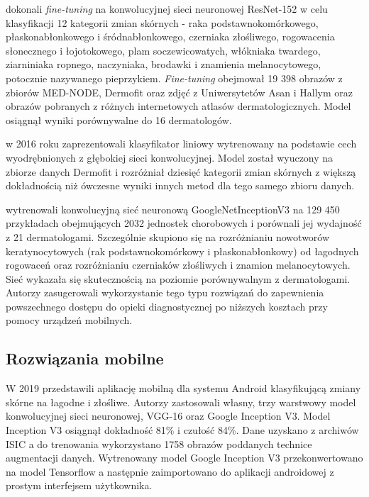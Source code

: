 \citet{Han_Kim_Lim_Park_Park_Chang_2018} dokonali \textit{fine-tuning} na konwolucyjnej sieci neuronowej ResNet-152 w celu klasyfikacji 12 kategorii zmian skórnych - raka podstawnokomórkowego, płaskonabłonkowego i śródnabłonkowego, czerniaka złośliwego, rogowacenia słonecznego i łojotokowego, plam soczewicowatych, włókniaka twardego, ziarniniaka ropnego, naczyniaka, brodawki i znamienia melanocytowego, potocznie nazywanego pieprzykiem. 
\textit{Fine-tuning} obejmował 19 398 obrazów z zbiorów MED-NODE, Dermofit oraz zdjęć z Uniwersytetów Asan i Hallym oraz obrazów pobranych z różnych internetowych atlasów dermatologicznych.
Model osiągnął wyniki porównywalne do 16 dermatologów.
 
\citet{Kawahara_2016} w 2016 roku zaprezentowali klasyfikator liniowy wytrenowany na podstawie cech wyodrębnionych z głębokiej sieci konwolucyjnej.
Model został wyuczony na zbiorze danych Dermofit i rozróżniał dziesięć kategorii zmian skórnych z większą dokładnością niż ówczesne wyniki innych metod dla tego samego zbioru danych.
 
\citet{Esteva_Kuprel_Novoa_Ko_Swetter_Blau_Thrun_2017} wytrenowali konwolucyjną sieć neuronową GoogleNetInceptionV3 na 129 450 przykładach obejmujących 2032 jednostek chorobowych i porównali jej wydajność z 21 dermatologami.
Szczególnie skupiono się na rozróżnianiu nowotworów keratynocytowych (rak podstawnokomórkowy i płaskonabłonkowy) od łagodnych rogowaceń oraz rozróżnianiu czerniaków złośliwych i znamion melanocytowych.
Sieć wykazała się skutecznością na poziomie porównywalnym z dermatologami.
Autorzy zasugerowali wykorzystanie tego typu rozwiązań do zapewnienia powszechnego dostępu do opieki diagnostycznej po niższych kosztach przy pomocy urządzeń mobilnych.

\subsection{Rozwiązania mobilne}

W 2019 \citet{Ajisafe_2020} przedstawili aplikację mobilną dla systemu Android klasyfikującą zmiany skórne na łagodne i złośliwe.
Autorzy zastosowali własny, trzy warstwowy model konwolucyjnej sieci neuronowej, VGG-16 oraz Google Inception V3.
Model Inception V3 osiągnął dokładność 81\% i czułość 84\%.
Dane uzyskano z archiwów ISIC a do trenowania wykorzystano 1758 obrazów poddanych technice augmentacji danych.
Wytrenowany model Google Inception V3 przekonwertowano na model Tensorflow a następnie zaimportowano do aplikacji androidowej z prostym interfejsem użytkownika.

